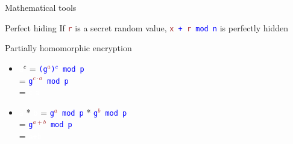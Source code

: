 \documentclass[dvipsnames]{beamer}
\newcommand{\pub}[1]{\textcolor{blue}{\texttt{#1}}}
\newcommand{\priv}[1]{\textcolor{brown}{\texttt{#1}}}
\newcommand{\enc}[1]{\colorbox{RubineRed}{\textcolor{white}{\texttt{#1}}}}
\begin{document}
    \begin{frame}{Mathematical tools}
        \begin{block}{Perfect hiding}
        If \priv{r} is a secret random value, \pub{\priv{x} + \priv{r} mod n} is perfectly hidden
        \end{block}

        \begin{block}{Partially homomorphic encryption}
            \begin{itemize}
                \item   \enc{a}$^c$ = \pub{(g\priv{$^a$})$^c$ mod p}
                        \\\hspace{0.8cm}= \pub{g\priv{$^{c\cdot a}$} mod p}
                        \\\hspace{0.8cm}= \enc{c$\cdot$a}
                \item   \enc{a} * \enc{b} = \pub{g\priv{$^a$} mod p} * \pub{g\priv{$^b$} mod p}
                        \\\hspace{1.3cm}= \pub{g\priv{$^{a+b}$} mod p}
                        \\\hspace{1.3cm}= \enc{a+b}
            \end{itemize}
        \end{block}
    \end{frame}
\end{document}
